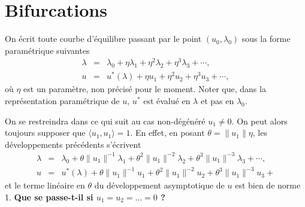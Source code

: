 \documentclass[12pt, final]{amsart}
\begin{document}
\section{Bifurcations}

On écrit toute courbe d'équilibre passant par le point $(u_0,
\lambda_0)$ sous la forme paramétrique suivantes
\begin{eqnarray}
  \lambda & = & \lambda_0 + \eta \lambda_1 + \eta^2 \lambda_2 + \eta^3
  \lambda_3 + \cdots,  \label{eq20211115075817}\\
  u & = & u^{\ast} (\lambda) + \eta u_1 + \eta^2 u_2 + \eta^3 u_3 + \cdots,
  \label{eq20211115075835}
\end{eqnarray}
où $\eta$ est un paramètre, non précisé pour le moment. Noter
que, dans la représentation paramétrique de $u$, $u^{\ast}$ est
évalué en $\lambda$ et pas en $\lambda_0$.

On se restreindra dans ce qui suit au cas non-dégénéré $u_1
\neq 0$. On peut alors toujours supposer que $\langle u_1, u_1 \rangle = 1$.
En effet, en posant $\theta = \lVert u_1 \rVert \eta$, les développements
précédents s'écrivent
\begin{eqnarray}
  \lambda & = & \lambda_0 + \theta \lVert u_1 \rVert^{- 1} \lambda_1 + \theta^2 \lVert u_1 \rVert^{- 2} \lambda_2 + \theta^3
  \lVert u_1 \rVert^{- 3} \lambda_3 + \cdots, \\
  u & = & u^{\ast} (\lambda) + \theta \lVert u_1 \rVert^{- 1} u_1 + \theta^2 \lVert u_1 \rVert^{- 2} u_2 + \theta^3 \lVert u_1
  \rVert^{- 3} u_3 +
\end{eqnarray}
et le terme linéaire en $\theta$ du développement asymptotique de $u$
est bien de norme 1. \textbf{Que se passe-t-il si $u_1 = u_2 = \ldots = 0$
?}
\end{document}
